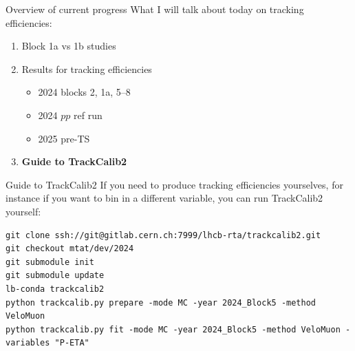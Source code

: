 \documentclass[xcolor={dvipsnames}]{beamer}
\begin{document}
\begin{frame}{Overview of current progress}
  \vspace{0.0cm}
  {\large What I will talk about today on tracking efficiencies:}
  \vspace{0.2cm}
  \begin{enumerate}
    \setlength\itemsep{1.0em}
    \item{Block 1a vs 1b studies}
    \item{Results for tracking efficiencies}
    \begin{itemize}
      \item{2024 blocks 2, 1a, 5--8}
      \item{2024 $pp$ ref run}
      \item{2025 pre-TS}
    \end{itemize}
    \item{\textbf{Guide to TrackCalib2}}
  \end{enumerate}
\end{frame}

\begin{frame}[fragile]{Guide to TrackCalib2}
  \vspace{0.0cm}
  {If you need to produce tracking efficiencies yourselves, for instance if you want to bin in a different variable, you can run TrackCalib2 yourself:}
  \vspace{0.2cm}
  \small
  \begin{lstlisting}
git clone ssh://git@gitlab.cern.ch:7999/lhcb-rta/trackcalib2.git
git checkout mtat/dev/2024
git submodule init
git submodule update
lb-conda trackcalib2
python trackcalib.py prepare -mode MC -year 2024_Block5 -method VeloMuon
python trackcalib.py fit -mode MC -year 2024_Block5 -method VeloMuon -variables "P-ETA"
  \end{lstlisting}
\end{frame}
\end{document}
